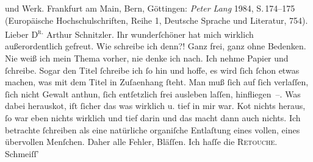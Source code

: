 \begin{ledgroupsized}[t]{13cm}
{{{                        und Werk}. Frankfurt am Main, Bern, Göttingen: \emph{Peter Lang} 1984, S. 174–175 (Europäische Hochschulschriften, Reihe 1, Deutsche Sprache und
                        Literatur, 754).}   }\toendnotes[C]{\smallbreak}\pstart{}{\pb}Lieber \textsc{D\textsuperscript{r.}} Arthur Schnitzler.\pend\pstart
           Ihr wunderſchöner \label{K_L00351_1v}\label{K_L00351_1h} hat mich wirklich
               außerordentlich gefreut. Wie schreibe ich denn?!\pend
           \pstart
           Ganz frei, ganz ohne Bedenken. Nie weiß ich mein Thema vorher, nie denke ich nach.
               Ich nehme Papier und ſchreibe. Sogar den Titel ſchreibe ich ſo hin und hoffe, es wird
               ſich ſchon etwas machen, was mit dem Titel in Zuſa{\geminationm}enhang ſteht.\pend
           \pstart
           Man muß ſich auf ſich verlaſſen, ſich nicht Gewalt anthun, ſich entſetzlich frei
               ausleben laſſen, hinfliegen –. {\pb}Was dabei herausko{\geminationm}t, iſt ſicher das was wirklich u. tief in mir war. Ko{\geminationm}t nichts heraus, ſo war eben nichts wirklich und tief
               darin und das macht dann auch nichts.\pend
           \pstart
           Ich betrachte ſchreiben als eine natürliche organiſche Entlaſtung eines vollen, eines
               übervollen Menſchen.\pend
           \pstart
           Daher alle \strikeout{\textcolor{gray}{meine}} Fehler, Bläſſen. Ich haſſe die \textsc{Retouche}. Schmeiſſ’

\end{ledgroupsized}
